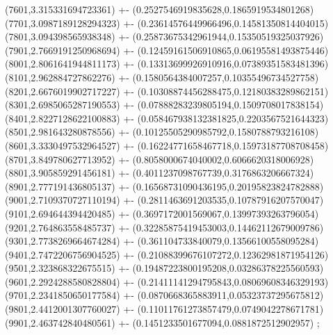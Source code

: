 {(7601,3.315331694723361) +- (0.2527546919835628,0.1865919534801268)
(7701,3.0987189128294323) +- (0.23614576449966496,0.14581350814404015)
(7801,3.094398565938348) +- (0.25873675342961944,0.15350519325037926)
(7901,2.7669191250968694) +- (0.12459161506910865,0.06195581493875446)
(8001,2.8061641944811173) +- (0.13313699926910916,0.07389351583481396)
(8101,2.962884727862276) +- (0.1580564384007257,0.10355496734527758)
(8201,2.6676019902717227) +- (0.10308874456288475,0.12180383289862151)
(8301,2.6985065287190553) +- (0.07888283239805194,0.1509708017838154)
(8401,2.8227128622100883) +- (0.058467938132381825,0.2203567521644323)
(8501,2.981643280878556) +- (0.10125505290985792,0.1580788793216108)
(8601,3.3330497532964527) +- (0.16224771658467718,0.15973187708708458)
(8701,3.849780627713952) +- (0.8058000674040002,0.6066620318006928)
(8801,3.905859291456181) +- (0.4011237098767739,0.3176863206667324)
(8901,2.777191436805137) +- (0.16568731090436195,0.20195823824782888)
(9001,2.7109370727110194) +- (0.2811463691203535,0.10787916207570047)
(9101,2.694644394420485) +- (0.3697172001569067,0.13997393263796054)
(9201,2.764863558485737) +- (0.32285875419453003,0.14462112679009786)
(9301,2.7738269664674284) +- (0.361104733840079,0.13566100558095284)
(9401,2.7472206756904525) +- (0.21088399676107272,0.12362981871954126)
(9501,2.323868322675515) +- (0.19487223800195208,0.03286378225560593)
(9601,2.2924288580828804) +- (0.21411141294795843,0.08069608346329193)
(9701,2.2341850650177584) +- (0.0870668365883911,0.05323737295675812)
(9801,2.4412001307760027) +- (0.11011761273857479,0.0749042278671781)
(9901,2.463742840480561) +- (0.1451233501677094,0.0881872512902957)
};
